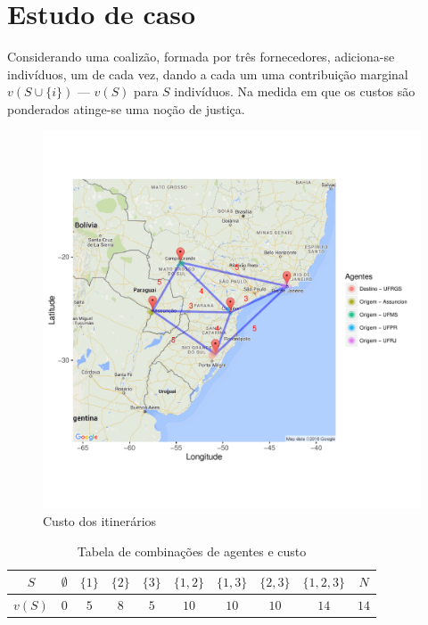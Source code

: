 \documentclass[
	article,			        %
	11pt,				          %
	oneside,			        %
	a4paper,			        %
	english,			        %
	brazil,				        %
	sumario=tradicional
]{abntex2}\usepackage[]{graphicx}\usepackage[]{color}
\makeatletter
\def\maxwidth{ %
  \ifdim\Gin@nat@width>\linewidth
    \linewidth
  \else
    \Gin@nat@width
  \fi
}
\newenvironment{knitrout}{}{} %
\makeatother
\begin{document}
\section{Estudo de caso}

Considerando uma coalizão, formada por três fornecedores, adiciona-se indivíduos, um de cada vez, dando a cada um uma contribuição marginal $v(S \cup \{i\})$ --- $v(S)$ para $S$ indivíduos. Na medida em que os custos são ponderados atinge-se uma noção de justiça.

\begin{knitrout}
\color{fgcolor}\begin{figure}[H]

{\centering \includegraphics[width=\maxwidth]{figure/unnamed-chunk-2-1} 

}

\caption[Custo dos itinerários]{Custo dos itinerários}\label{fig:unnamed-chunk-2}
\end{figure}


\end{knitrout}

\begin{table}[!h]
  \centering
  \caption{Tabela de combinações de agentes e custo}
  \label{Tab1}
  \begin{tabular}{@{}cccccccccc@{}}
  \toprule
    $S$    & $\emptyset$ & $\{1\}$ & $\{2\}$ & $\{3\}$ & $\{1,2\}$ & $\{1,3\}$ & $\{2,3\}$ &     $\{1,2,3\}$ & $N$  \\ \midrule
    $v(S)$ & $0$         & $5$     & $8$     & $5$     & $10$      & $10$      & $10$      &     $14$        & $14$ \\ \bottomrule
  \end{tabular}
\end{table}
\end{document}
